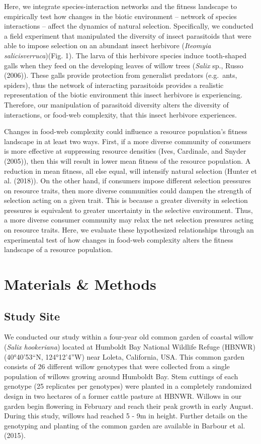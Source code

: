 \documentclass[]{elsarticle} %
\begin{document}
Here, we integrate species-interaction networks and the fitness
landscape to empirically test how changes in the biotic environment --
network of species interactions -- affect the dynamics of natural
selection. Specifically, we conducted a field experiment that
manipulated the diversity of insect parasitoids that were able to impose
selection on an abundant insect herbivore (\emph{Iteomyia
salicisverruca})(Fig. 1). The larva of this herbivore species induce
tooth-shaped galls when they feed on the developing leaves of willow
trees (\emph{Salix} sp., Russo (2006)). These galls provide protection
from generalist predators (e.g.~ants, spiders), thus the network of
interacting parasitoids provides a realistic representation of the
biotic environment this insect herbivore is experiencing. Therefore, our
manipulation of parasitoid diversity alters the diversity of
interactions, or food-web complexity, that this insect herbivore
experiences.

Changes in food-web complexity could influence a resource population's
fitness landscape in at least two ways. First, if a more diverse
community of consumers is more effective at suppressing resource
densities (Ives, Cardinale, and Snyder (2005)), then this will result in
lower mean fitness of the resource population. A reduction in mean
fitness, all else equal, will intensify natural selection (Hunter et al.
(2018)). On the other hand, if consumers impose different selection
pressures on resource traits, then more diverse communities could dampen
the strength of selection acting on a given trait. This is because a
greater diversity in selection pressures is equivalent to greater
uncertainty in the selective environment. Thus, a more diverse consumer
community may relax the net selection pressures acting on resource
traits. Here, we evaluate these hypothesized relationships through an
experimental test of how changes in food-web complexity alters the
fitness landscape of a resource population.

\section{Materials \& Methods}\label{materials-methods}

\subsection{Study Site}\label{study-site}

We conducted our study within a four-year old common garden of coastal
willow (\emph{Salix hookeriana}) located at Humboldt Bay National
Wildlife Refuge (HBNWR) (40°40'53``N, 124°12'4''W) near Loleta,
California, USA. This common garden consists of 26 different willow
genotypes that were collected from a single population of willows
growing around Humboldt Bay. Stem cuttings of each genotype (25
replicates per genotypes) were planted in a completely randomized design
in two hectares of a former cattle pasture at HBNWR. Willows in our
garden begin flowering in February and reach their peak growth in early
August. During this study, willows had reached 5 - 9m in height. Further
details on the genotyping and planting of the common garden are
available in Barbour et al. (2015).
\end{document}
